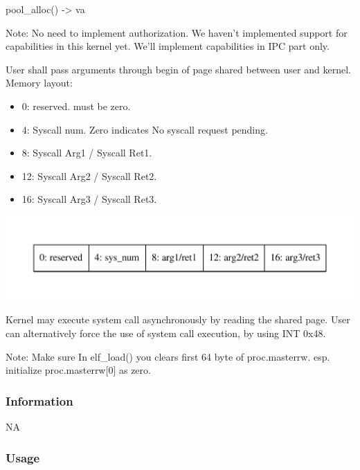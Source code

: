 \documentclass[]{book}
\newenvironment{Shaded}{}{}
\newcommand{\NormalTok}[1]{{#1}}
\begin{document}
\begin{enumerate}
\begin{itemize}
\begin{Shaded}
\begin{Highlighting}[]
\NormalTok{pool_alloc() -> va}
\end{Highlighting}
\end{Shaded}
  \end{itemize}
\end{enumerate}

Note: No need to implement authorization. We haven't implemented support
for capabilities in this kernel yet. We'll implement capabilities in IPC
part only.

User shall pass arguments through begin of page shared between user and
kernel. Memory layout:

\begin{itemize}
\itemsep1pt\parskip0pt
\item
  0: reserved. must be zero.
\item
  4: Syscall num. Zero indicates No syscall request pending.
\item
  8: Syscall Arg1 / Syscall Ret1.
\item
  12: Syscall Arg2 / Syscall Ret2.
\item
  16: Syscall Arg3 / Syscall Ret3.
\end{itemize}

\includegraphics{graphviz-images/47fc597a5f4ea59d064276c7b792ba3ec05d947f.pdf}

Kernel may execute system call asynchronously by reading the shared
page. User can alternatively force the use of system call execution, by
using INT 0x48.

Note: Make sure In elf\_load() you clears first 64 byte of
proc.masterrw. esp. initialize proc.masterrw{[}0{]} as zero.

\subsubsection*{Information}\label{information-12}

NA

\subsubsection*{Usage}\label{usage-12}
\end{document}
